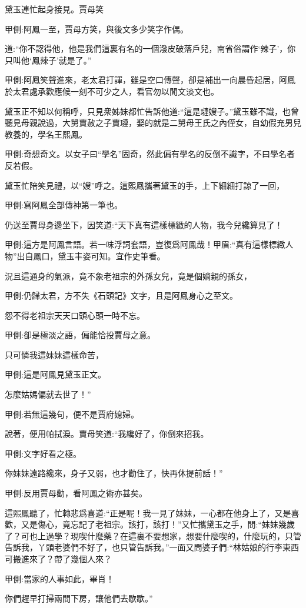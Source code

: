 \begin{parag}
    黛玉連忙起身接見。賈母笑\begin{note}甲側:阿鳳一至，賈母方笑，與後文多少笑字作偶。\end{note}道:“你不認得他，他是我們這裏有名的一個潑皮破落戶兒，南省俗謂作‘辣子’，你只叫他‘鳳辣子’就是了。”\begin{note}甲側:阿鳳笑聲進來，老太君打諢，雖是空口傳聲，卻是補出一向晨昏起居，阿鳳於太君處承歡應候一刻不可少之人，看官勿以閒文淡文也。\end{note}黛玉正不知以何稱呼，只見衆姊妹都忙告訴他道:“這是璉嫂子。”黛玉雖不識，也曾聽見母親說過，大舅賈赦之子賈璉，娶的就是二舅母王氏之內侄女，自幼假充男兒教養的，學名王熙鳳。\begin{note}甲側:奇想奇文。以女子曰“學名”固奇，然此偏有學名的反倒不識字，不曰學名者反若假。\end{note}黛玉忙陪笑見禮，以“嫂”呼之。這熙鳳攜著黛玉的手，上下細細打諒了一回，\begin{note}甲側:寫阿鳳全部傳神第一筆也。\end{note}仍送至賈母身邊坐下，因笑道:“天下真有這樣標緻的人物，我今兒纔算見了！\begin{note}甲側:這方是阿鳳言語。若一味浮詞套語，豈復爲阿鳳哉！甲眉:“真有這樣標緻人物”出自鳳口，黛玉丰姿可知。宜作史筆看。\end{note}況且這通身的氣派，竟不象老祖宗的外孫女兒，竟是個嫡親的孫女，\begin{note}甲側:仍歸太君，方不失《石頭記》文字，且是阿鳳身心之至文。\end{note}怨不得老祖宗天天口頭心頭一時不忘。\begin{note}甲側:卻是極淡之語，偏能恰投賈母之意。\end{note}只可憐我這妹妹這樣命苦，\begin{note}甲側:這是阿鳳見黛玉正文。\end{note}怎麼姑媽偏就去世了！”\begin{note}甲側:若無這幾句，便不是賈府媳婦。\end{note}說著，便用帕拭淚。賈母笑道:“我纔好了，你倒來招我。\begin{note}甲側:文字好看之極。\end{note}你妹妹遠路纔來，身子又弱，也才勸住了，快再休提前話！”\begin{note}甲側:反用賈母勸，看阿鳳之術亦甚矣。\end{note}這熙鳳聽了，忙轉悲爲喜道:“正是呢！我一見了妹妹，一心都在他身上了，又是喜歡，又是傷心，竟忘記了老祖宗。該打，該打！”又忙攜黛玉之手，問:“妹妹幾歲了？可也上過學？現喫什麼藥？在這裏不要想家，想要什麼喫的，什麼玩的，只管告訴我，丫頭老婆們不好了，也只管告訴我。”一面又問婆子們:“林姑娘的行李東西可搬進來了？帶了幾個人來？\begin{note}甲側:當家的人事如此，畢肖！\end{note}你們趕早打掃兩間下房，讓他們去歇歇。”
\end{parag}




